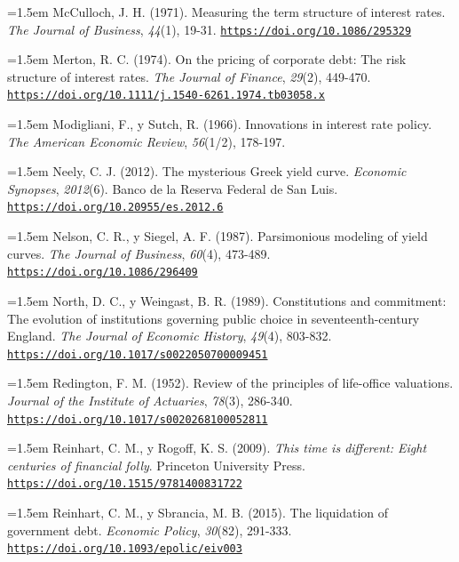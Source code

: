 \documentclass[10pt,a4paper]{article}
\begin{document}
\noindent\hangindent=1.5em McCulloch, J. H. (1971). Measuring the term structure of interest rates. \textit{The Journal of Business}, \textit{44}(1), 19-31. \href{https://doi.org/10.1086/295329}{\nolinkurl{https://doi.org/10.1086/295329}}

\noindent\hangindent=1.5em Merton, R. C. (1974). On the pricing of corporate debt: The risk structure of interest rates. \textit{The Journal of Finance}, \textit{29}(2), 449-470. \href{https://doi.org/10.1111/j.1540-6261.1974.tb03058.x}{\nolinkurl{https://doi.org/10.1111/j.1540-6261.1974.tb03058.x}}

\noindent\hangindent=1.5em Modigliani, F., y Sutch, R. (1966). Innovations in interest rate policy. \textit{The American Economic Review}, \textit{56}(1/2), 178-197.

\noindent\hangindent=1.5em Neely, C. J. (2012). The mysterious Greek yield curve. \textit{Economic Synopses}, \textit{2012}(6). Banco de la Reserva Federal de San Luis. \href{https://doi.org/10.20955/es.2012.6}{\nolinkurl{https://doi.org/10.20955/es.2012.6}}

\noindent\hangindent=1.5em Nelson, C. R., y Siegel, A. F. (1987). Parsimonious modeling of yield curves. \textit{The Journal of Business}, \textit{60}(4), 473-489. \href{https://doi.org/10.1086/296409}{\nolinkurl{https://doi.org/10.1086/296409}}

\noindent\hangindent=1.5em North, D. C., y Weingast, B. R. (1989). Constitutions and commitment: The evolution of institutions governing public choice in seventeenth-century England. \textit{The Journal of Economic History}, \textit{49}(4), 803-832. \href{https://doi.org/10.1017/s0022050700009451}{\nolinkurl{https://doi.org/10.1017/s0022050700009451}}

\noindent\hangindent=1.5em Redington, F. M. (1952). Review of the principles of life-office valuations. \textit{Journal of the Institute of Actuaries}, \textit{78}(3), 286-340. \href{https://doi.org/10.1017/s0020268100052811}{\nolinkurl{https://doi.org/10.1017/s0020268100052811}}

\noindent\hangindent=1.5em Reinhart, C. M., y Rogoff, K. S. (2009). \textit{This time is different: Eight centuries of financial folly}. Princeton University Press. \href{https://doi.org/10.1515/9781400831722}{\nolinkurl{https://doi.org/10.1515/9781400831722}}

\noindent\hangindent=1.5em Reinhart, C. M., y Sbrancia, M. B. (2015). The liquidation of government debt. \textit{Economic Policy}, \textit{30}(82), 291-333. \href{https://doi.org/10.1093/epolic/eiv003}{\nolinkurl{https://doi.org/10.1093/epolic/eiv003}}
\end{document}
